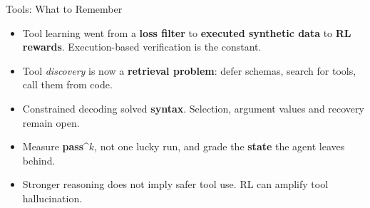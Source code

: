 \begin{frame}{Tools: What to Remember}
    \begin{itemize}\itemsep0.6em
        \item Tool learning went from a \textbf{loss filter} to \textbf{executed synthetic data} to \textbf{RL rewards}. Execution-based verification is the constant.
        \item Tool \emph{discovery} is now a \textbf{retrieval problem}: defer schemas, search for tools, call them from code.
        \item Constrained decoding solved \textbf{syntax}. Selection, argument values and recovery remain open.
        \item Measure \textbf{pass\textasciicircum$k$}, not one lucky run, and grade the \textbf{state} the agent leaves behind.
        \item Stronger reasoning does not imply safer tool use. RL can amplify tool hallucination.
    \end{itemize}
    \vspace{0.4em}
\end{frame}
